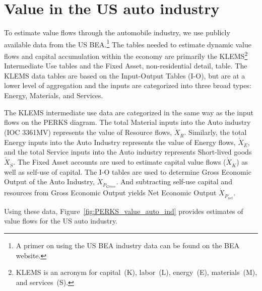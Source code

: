 \section{Value in the US auto industry}
\label{sec:value_auto}

To estimate value flows through the automobile industry, 
we use publicly available data from the 
US BEA.\footnote{A 
	primer on using the US BEA 
	industry data can be found 
	on the BEA website.\cite{Streitwieser:2011aa}}
The  tables needed to estimate dynamic 
value flows and capital accumulation within the economy 
are primarily the  KLEMS\footnote{KLEMS is an acronym for 
	capital~(K), labor~(L), energy~(E), materials~(M), and services~(S).} 
Intermediate Use
tables and 
the Fixed Asset, non-residential detail, table. 
The KLEMS data tables
are based on the Input-Output Tables (I-O), 
but are at a lower level of aggregation and the inputs are categorized 
into three broad types: Energy, Materials, and Services.

The KLEMS intermediate use data are categorized in the same
way as the input flows on the PERKS diagram. 
The total Material inputs into the Auto industry (IOC 3361MV) 
represents the value of Resource flows, $\dot{X}_{\dot{R}}$. 
Similarly, the total Energy inputs into the 
Auto Industry represents the value of Energy flows, $\dot{X}_{\dot{E}}$,
and the total Service inputs into the Auto industry represents 
Short-lived goods $\dot{X}_{\dot{S}}$.
The Fixed Asset accounts are
used to estimate capital value flows 
($\dot{X}_{\dot{K}}$) as well as self-use of capital.  
The I-O tables are used to determine Gross Economic Output of the 
Auto Industry, $\dot{X}_{\dot{P}_{Gross}}$. And subtracting self-use capital and resources
from Gross Economic Output yields Net Economic Output $\dot{X}_{\dot{P}_{net}}$.
   

Using these data, Figure~\ref{fig:PERKS_value_auto_ind} provides estimates 
of value flows for the US auto industry. 


